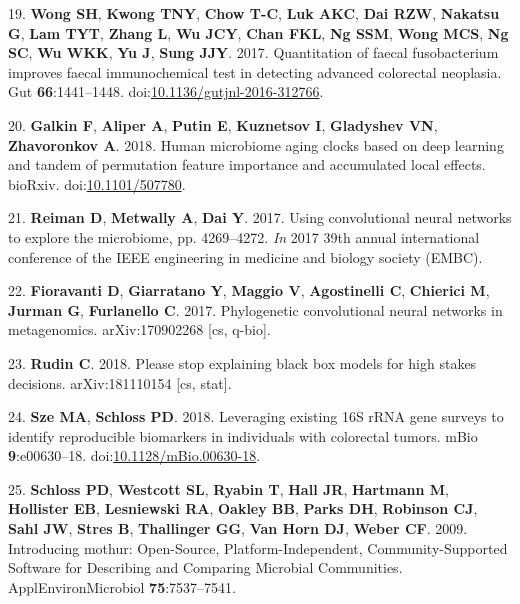 \documentclass[11pt,]{article}
\begin{document}
\hypertarget{ref-wong_quantitation_2017}{}
19. \textbf{Wong SH}, \textbf{Kwong TNY}, \textbf{Chow T-C}, \textbf{Luk
AKC}, \textbf{Dai RZW}, \textbf{Nakatsu G}, \textbf{Lam TYT},
\textbf{Zhang L}, \textbf{Wu JCY}, \textbf{Chan FKL}, \textbf{Ng SSM},
\textbf{Wong MCS}, \textbf{Ng SC}, \textbf{Wu WKK}, \textbf{Yu J},
\textbf{Sung JJY}. 2017. Quantitation of faecal fusobacterium improves
faecal immunochemical test in detecting advanced colorectal neoplasia.
Gut \textbf{66}:1441--1448.
doi:\href{https://doi.org/10.1136/gutjnl-2016-312766}{10.1136/gutjnl-2016-312766}.

\hypertarget{ref-galkin_human_2018}{}
20. \textbf{Galkin F}, \textbf{Aliper A}, \textbf{Putin E},
\textbf{Kuznetsov I}, \textbf{Gladyshev VN}, \textbf{Zhavoronkov A}.
2018. Human microbiome aging clocks based on deep learning and tandem of
permutation feature importance and accumulated local effects. bioRxiv.
doi:\href{https://doi.org/10.1101/507780}{10.1101/507780}.

\hypertarget{ref-reiman_using_2017}{}
21. \textbf{Reiman D}, \textbf{Metwally A}, \textbf{Dai Y}. 2017. Using
convolutional neural networks to explore the microbiome, pp. 4269--4272.
\emph{In} 2017 39th annual international conference of the IEEE
engineering in medicine and biology society (EMBC).

\hypertarget{ref-fioravanti_phylogenetic_2017}{}
22. \textbf{Fioravanti D}, \textbf{Giarratano Y}, \textbf{Maggio V},
\textbf{Agostinelli C}, \textbf{Chierici M}, \textbf{Jurman G},
\textbf{Furlanello C}. 2017. Phylogenetic convolutional neural networks
in metagenomics. arXiv:170902268 {[}cs, q-bio{]}.

\hypertarget{ref-rudin_please_2018}{}
23. \textbf{Rudin C}. 2018. Please stop explaining black box models for
high stakes decisions. arXiv:181110154 {[}cs, stat{]}.

\hypertarget{ref-sze_leveraging_2018}{}
24. \textbf{Sze MA}, \textbf{Schloss PD}. 2018. Leveraging existing 16S
rRNA gene surveys to identify reproducible biomarkers in individuals
with colorectal tumors. mBio \textbf{9}:e00630--18.
doi:\href{https://doi.org/10.1128/mBio.00630-18}{10.1128/mBio.00630-18}.

\hypertarget{ref-schloss_introducing_2009}{}
25. \textbf{Schloss PD}, \textbf{Westcott SL}, \textbf{Ryabin T},
\textbf{Hall JR}, \textbf{Hartmann M}, \textbf{Hollister EB},
\textbf{Lesniewski RA}, \textbf{Oakley BB}, \textbf{Parks DH},
\textbf{Robinson CJ}, \textbf{Sahl JW}, \textbf{Stres B},
\textbf{Thallinger GG}, \textbf{Van Horn DJ}, \textbf{Weber CF}. 2009.
Introducing mothur: Open-Source, Platform-Independent,
Community-Supported Software for Describing and Comparing Microbial
Communities. ApplEnvironMicrobiol \textbf{75}:7537--7541.
\end{document}
